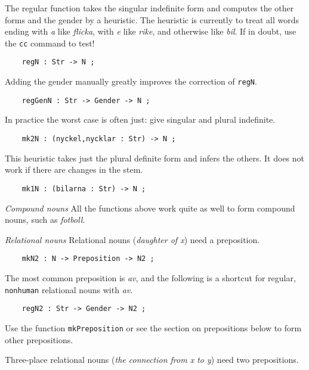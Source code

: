 \documentclass[11pt,a4paper]{article}
\newcommand{\subsubsubsection}[1]{\textit{#1}}
\begin{document}
The regular function takes the singular indefinite form and computes the other
forms and the gender by a heuristic. The heuristic is currently 
to treat all words ending with \textit{a} like \textit{flicka}, with \textit{e} like \textit{rike},
and otherwise like \textit{bil}.
If in doubt, use the \texttt{cc} command to test!

\begin{verbatim}
    regN : Str -> N ;
\end{verbatim}

Adding the gender manually greatly improves the correction of \texttt{regN}.

\begin{verbatim}
    regGenN : Str -> Gender -> N ;
\end{verbatim}

In practice the worst case is often just: give singular and plural indefinite.

\begin{verbatim}
    mk2N : (nyckel,nycklar : Str) -> N ;
\end{verbatim}

This heuristic takes just the plural definite form and infers the others.
It does not work if there are changes in the stem.

\begin{verbatim}
    mk1N : (bilarna : Str) -> N ;
\end{verbatim}

\subsubsubsection{Compound nouns}
All the functions above work quite as well to form compound nouns,
such as \textit{fotboll}. 

\subsubsubsection{Relational nouns}
Relational nouns (\textit{daughter of x}) need a preposition. 

\begin{verbatim}
    mkN2 : N -> Preposition -> N2 ;
\end{verbatim}

The most common preposition is \textit{av}, and the following is a
shortcut for regular, \texttt{nonhuman} relational nouns with \textit{av}.

\begin{verbatim}
    regN2 : Str -> Gender -> N2 ;
\end{verbatim}

Use the function \texttt{mkPreposition} or see the section on prepositions below to  
form other prepositions.

Three-place relational nouns (\textit{the connection from x to y}) need two prepositions.
\end{document}
